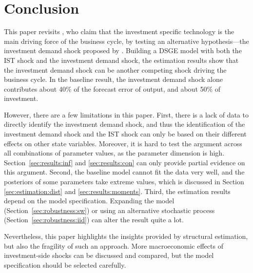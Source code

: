 \section{Conclusion}
\label{sec:conclusion}
This paper revisits \cite{justinianoInvestmentShocksBusiness2010}, who claim that the investment specific technology is the main driving force of the business cycle, by testing an alternative hypothesis---the investment demand shock proposed by \cite{nireiOriginsPropagationAnimal}. Building a DSGE model with both the IST shock and the investment demand shock, the estimation results show that the investment demand shock can be another competing shock driving the business cycle. In the baseline result, the investment demand shock alone contributes about 40\% of the forecast error of output, and about 50\% of investment.

However, there are a few limitations in this paper. First, there is a lack of data to directly identify the investment demand shock, and thus the identification of the investment demand shock and the IST shock can only be based on their different effects on other state variables. Moreover, it is hard to test the argument across all combinations of parameter values, as the parameter dimension is high. Section~\ref{sec:results:inf} and \ref{sec:results:con} can only provide partial evidence on this argument.
Second, the baseline model cannot fit the data very well, and the posteriors of some parameters take extreme values, which is discussed in Section \ref{sec:estimation:dist} and \ref{sec:results:moments}. Third, the estimation results depend on the model specification. Expanding the model (Section~\ref{sec:robustness:sw}) or using an alternative stochastic process (Section~\ref{sec:robustness:iid}) can alter the result quite a lot.

Nevertheless, this paper highlights the insights provided by structural estimation, but also the fragility of such an approach. More macroeconomic effects of investment-side shocks can be discussed and compared, but the model specification should be selected carefully.